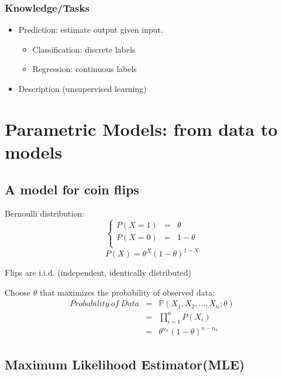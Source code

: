 \documentclass[letterpaper, 10pt, twocolumn]{article}
\begin{document}
\subsubsection{Knowledge/Tasks}

\begin{itemize}
	\item Prediction: estimate output given input.
	\begin{itemize}
		\item Classification: discrete labels
		\item Regression: continuous labels
	\end{itemize}
	\item Description (unsupervised learning)
\end{itemize}

\newpage

\section{Parametric Models: from data to models}

\subsection{A model for coin flips}

Bernoulli distribution: 
\begin{equation}
\left\{\begin{array}{rcl}
P(X=1) & = & \theta \\
P(X=0) & = & 1-\theta \\
\end{array}
\right.
\end{equation}
$$P(X) = \theta^{X}(1-\theta)^{1-X}$$

Flips are i.i.d. (independent, identically distributed)

Choose $\theta$ that maximizes the probability of observed data:
\begin{equation}
\begin{array}{rcl}
Probability~of~Data & = & \mathbb{P}(X_1,X_2,\dots,X_n;\theta) \\
					& = & \prod_{i=1}^{n} P(X_i) \\
					& = & \theta^{n_h}(1-\theta)^{n-n_h}
\end{array}
\end{equation}

\subsection{Maximum Likelihood Estimator(MLE)}
\end{document}
